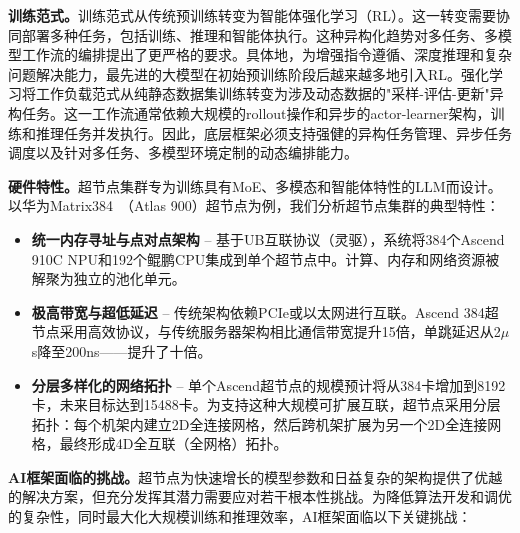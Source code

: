 \documentclass[11pt]{article}
\begin{document}
\noindent \textbf{训练范式。}训练范式从传统预训练转变为智能体强化学习（RL）。这一转变需要协同部署多种任务，包括训练、推理和智能体执行。这种异构化趋势对多任务、多模型工作流的编排提出了更严格的要求。具体地，为增强指令遵循、深度推理和复杂问题解决能力，最先进的大模型在初始预训练阶段后越来越多地引入RL。强化学习将工作负载范式从纯静态数据集训练转变为涉及动态数据的"采样-评估-更新"异构任务。这一工作流通常依赖大规模的rollout操作和异步的actor-learner架构，训练和推理任务并发执行。因此，底层框架必须支持强健的异构任务管理、异步任务调度以及针对多任务、多模型环境定制的动态编排能力。

\noindent \textbf{硬件特性。}超节点集群专为训练具有MoE、多模态和智能体特性的LLM而设计。以华为Matrix384~\cite{matrix384}（Atlas 900）超节点为例，我们分析超节点集群的典型特性：

\begin{itemize}
    \item \textbf{统一内存寻址与点对点架构} -- 基于UB互联协议（灵驱），系统将384个Ascend 910C NPU和192个鲲鹏CPU集成到单个超节点中。计算、内存和网络资源被解聚为独立的池化单元。
    \item \textbf{极高带宽与超低延迟} -- 传统架构依赖PCIe或以太网进行互联。Ascend 384超节点采用高效协议，与传统服务器架构相比通信带宽提升15倍，单跳延迟从2$\mu$s降至200ns——提升了十倍。
    \item \textbf{分层多样化的网络拓扑} -- 单个Ascend超节点的规模预计将从384卡增加到8192卡，未来目标达到15488卡。为支持这种大规模可扩展互联，超节点采用分层拓扑：每个机架内建立2D全连接网格，然后跨机架扩展为另一个2D全连接网格，最终形成4D全互联（全网格）拓扑。
\end{itemize}

\noindent \textbf{AI框架面临的挑战。}超节点为快速增长的模型参数和日益复杂的架构提供了优越的解决方案，但充分发挥其潜力需要应对若干根本性挑战。为降低算法开发和调优的复杂性，同时最大化大规模训练和推理效率，AI框架面临以下关键挑战：
\end{document}
